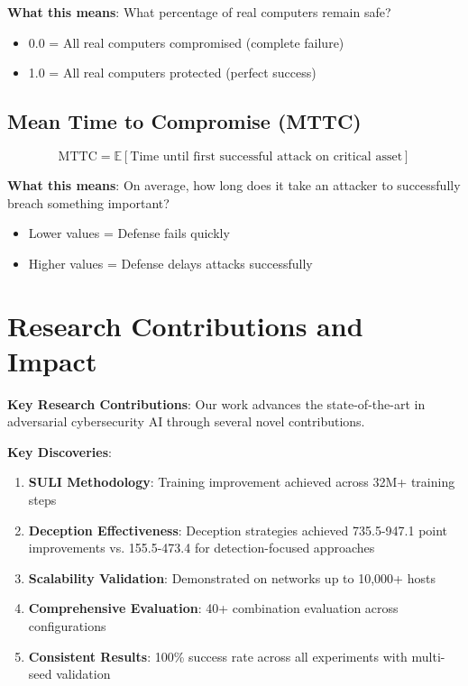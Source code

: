 \documentclass[11pt]{article}
\begin{document}
\begin{intuition}
\begin{mathdetails}
\textbf{What this means}: What percentage of real computers remain safe?
\begin{itemize}
\item 0.0 = All real computers compromised (complete failure)
\item 1.0 = All real computers protected (perfect success)
\end{itemize}
\end{mathdetails}

\subsection{Mean Time to Compromise (MTTC)}
\begin{mathdetails}
$$\text{MTTC} = \mathbb{E}[\text{Time until first successful attack on critical asset}]$$

\textbf{What this means}: On average, how long does it take an attacker to successfully breach something important?
\begin{itemize}
\item Lower values = Defense fails quickly
\item Higher values = Defense delays attacks successfully
\end{itemize}
\end{mathdetails}

\section{Research Contributions and Impact}

\begin{foundation}
\textbf{Key Research Contributions}: Our work advances the state-of-the-art in adversarial cybersecurity AI through several novel contributions.
\end{foundation}

\begin{foundation}
\textbf{Key Discoveries}:
\begin{enumerate}
\item \textbf{SULI Methodology}: Training improvement achieved across 32M+ training steps
\item \textbf{Deception Effectiveness}: Deception strategies achieved 735.5-947.1 point improvements vs. 155.5-473.4 for detection-focused approaches
\item \textbf{Scalability Validation}: Demonstrated on networks up to 10,000+ hosts
\item \textbf{Comprehensive Evaluation}: 40+ combination evaluation across configurations
\item \textbf{Consistent Results}: 100\% success rate across all experiments with multi-seed validation
\end{enumerate}
\end{foundation}


\end{intuition}
\end{document}
